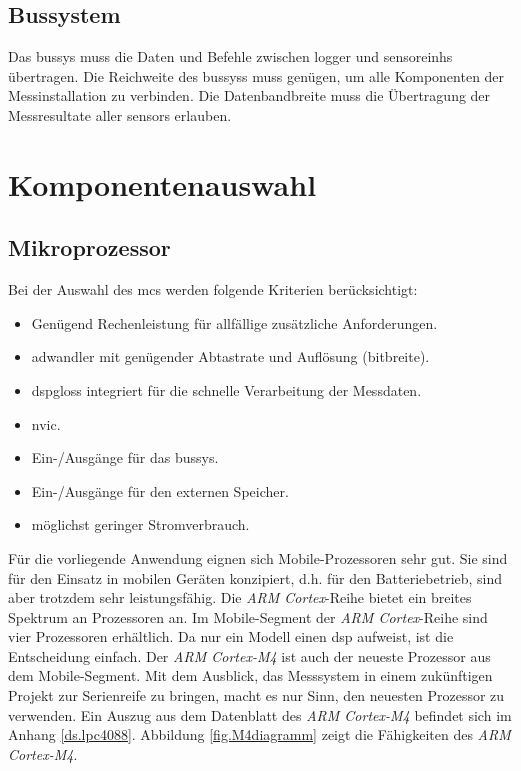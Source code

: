 \subsection{Bussystem}
Das \gls{bussys} muss die Daten und Befehle zwischen \gls{logger} und \glspl{sensoreinh} übertragen. Die Reichweite des \gls{bussys}s muss genügen, um alle Komponenten der Messinstallation zu verbinden. Die Datenbandbreite muss die Übertragung der Messresultate aller \glspl{sensor} erlauben.


\section{Komponentenauswahl}

\subsection{Mikroprozessor}
Bei der Auswahl des \gls{mc}s werden folgende Kriterien berücksichtigt:

\begin{itemize}
\item Genügend Rechenleistung für allfällige zusätzliche Anforderungen.
\item \gls{adwandler} mit genügender Abtastrate und Auflösung (\gls{bitbreite}).
\item \gls{dspgloss} integriert für die schnelle Verarbeitung der Messdaten.
\item \gls{nvic}.
\item Ein-/Ausgänge für das \gls{bussys}.
\item Ein-/Ausgänge für den externen Speicher.
\item möglichst geringer Stromverbrauch.
\end{itemize}

Für die vorliegende Anwendung eignen sich Mobile-Prozessoren sehr gut. Sie sind für den Einsatz in mobilen Geräten konzipiert, d.h. für den Batteriebetrieb, sind aber trotzdem sehr leistungsfähig. Die \emph{ARM Cortex}-Reihe bietet ein breites Spektrum an Prozessoren an. Im Mobile-Segment der \emph{ARM Cortex}-Reihe sind vier Prozessoren erhältlich. Da nur ein Modell einen \gls{dsp} aufweist, ist die Entscheidung einfach. Der \emph{ARM Cortex-M4} ist auch der neueste Prozessor aus dem Mobile-Segment. Mit dem Ausblick, das Messsystem in einem zukünftigen Projekt zur Serienreife zu bringen, macht es nur Sinn, den neuesten Prozessor zu verwenden. Ein Auszug aus dem Datenblatt des \emph{ARM Cortex-M4} befindet sich im Anhang \ref{ds.lpc4088}. Abbildung \ref{fig.M4diagramm} zeigt die Fähigkeiten des \emph{ARM Cortex-M4}.

